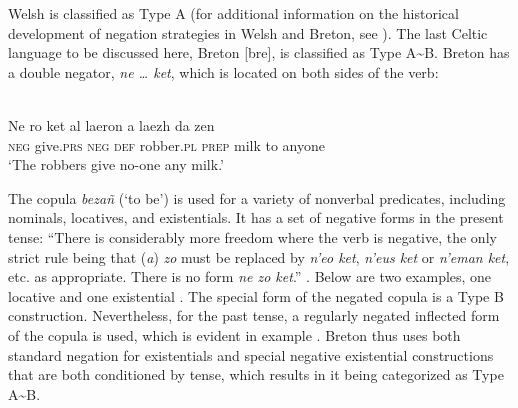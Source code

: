 ﻿\documentclass[output=paper]{langsci/langscibook}
\begin{document}
%
Welsh is classified as Type A (for additional information on the
historical development of negation strategies in Welsh and Breton, see
\citealt{Willis2013}). The last Celtic language to be discussed here,
Breton [bre], is classified as Type A{\textasciitilde}B. Breton has a double negator, \textit{ne … ket}, which is located on both sides of the verb:
%
\begin{exe}\ex
{}\\
    \gll Ne ro ket al laeron a laezh da zen \\
\textsc{neg} give.\textsc{prs} \textsc{neg} \textsc{def} robber.\textsc{pl} \textsc{prep} milk  to anyone \\
    \glt `The robbers give no-one any milk.' 
    \end{exe}
%
The copula \textit{bezañ} (`to be') \parencite[144ff]{Press1986} is used
for a variety of nonverbal predicates, including nominals, locatives, and
existentials. It has a set of negative forms in the present tense: “There
is considerably more freedom where the verb is negative, the only strict
rule being that (\textit{a}) \textit{zo} must be replaced by \textit{n'eo
ket}, \textit{n'eus ket} or \textit{n'eman ket}, etc. as appropriate. There
is no form \textit{ne zo ket}.” \citep[152]{Press1986}. Below are two
examples, one locative  and one existential
. The special form of the negated copula is a
Type B construction. Nevertheless, for the past tense, a regularly negated
inflected form of the copula is used, which is evident in example
. Breton thus uses both standard negation for existentials and special negative existential constructions that are both conditioned by tense, which results in it being categorized as Type A{\textasciitilde}B.
%
\end{document}
